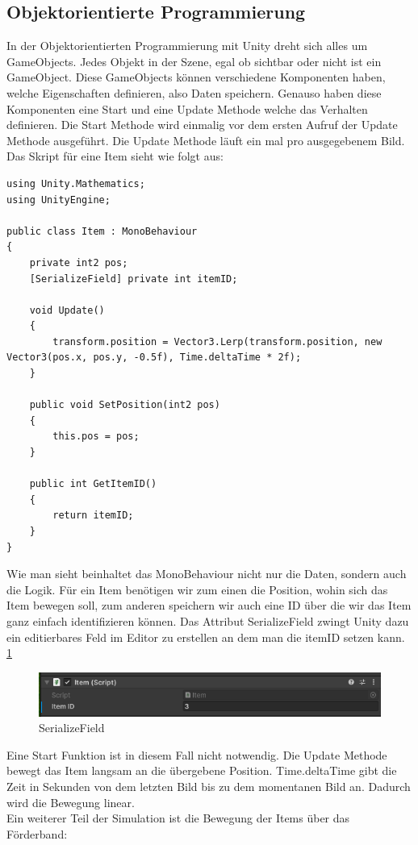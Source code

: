 \documentclass[12pt, titlepage]{article}
\begin{document}
\subsection{Objektorientierte Programmierung}
In der Objektorientierten Programmierung mit Unity dreht sich alles um GameObjects. Jedes Objekt in der Szene, egal ob sichtbar oder nicht ist ein GameObject. Diese GameObjects können verschiedene Komponenten haben, welche Eigenschaften definieren, also Daten speichern. Genauso haben diese Komponenten eine Start und eine Update Methode welche das Verhalten definieren. Die Start Methode wird einmalig vor dem ersten Aufruf der Update Methode ausgeführt. Die Update Methode läuft ein mal pro ausgegebenem Bild. Das Skript für eine Item sieht wie folgt aus:
\begin{lstlisting}[style=code, caption={Item Komponente OOP}]
using Unity.Mathematics;
using UnityEngine;

public class Item : MonoBehaviour
{
    private int2 pos;
    [SerializeField] private int itemID;

    void Update()
    {
        transform.position = Vector3.Lerp(transform.position, new Vector3(pos.x, pos.y, -0.5f), Time.deltaTime * 2f);
    }

    public void SetPosition(int2 pos)
    {
        this.pos = pos;
    }

    public int GetItemID()
    {
        return itemID;
    }
}
\end{lstlisting}
Wie man sieht beinhaltet das MonoBehaviour nicht nur die Daten, sondern auch die Logik. Für ein Item benötigen wir zum einen die Position, wohin sich das Item bewegen soll, zum anderen speichern wir auch eine ID über die wir das Item ganz einfach identifizieren können. Das Attribut \glqq SerializeField\grqq{} zwingt Unity dazu ein editierbares Feld im Editor zu erstellen an dem man die itemID setzen kann. \ref{fig:SerializeField}
\begin{figure}
\includegraphics[scale=1]{Bilder/SerializeField.png}
\caption{SerializeField}
\label{fig:SerializeField}
\end{figure}
Eine Start Funktion ist in diesem Fall nicht notwendig. Die Update Methode bewegt das Item langsam an die übergebene Position. Time.deltaTime gibt die Zeit in Sekunden von dem letzten Bild bis zu dem momentanen Bild an. Dadurch wird die Bewegung linear.\\Ein weiterer Teil der Simulation ist die Bewegung der Items über das Förderband: 
\end{document}
